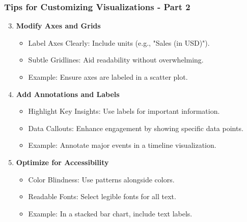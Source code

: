 \documentclass[aspectratio=169]{beamer}
\begin{document}
\begin{frame}[fragile]
    \frametitle{Tips for Customizing Visualizations - Part 2}
    \begin{enumerate}
        \setcounter{enumi}{2} %
        \item \textbf{Modify Axes and Grids}
            \begin{itemize}
                \item Label Axes Clearly: Include units (e.g., "Sales (in USD)").
                \item Subtle Gridlines: Aid readability without overwhelming.
                \item Example: Ensure axes are labeled in a scatter plot.
            \end{itemize}

        \item \textbf{Add Annotations and Labels}
            \begin{itemize}
                \item Highlight Key Insights: Use labels for important information.
                \item Data Callouts: Enhance engagement by showing specific data points.
                \item Example: Annotate major events in a timeline visualization.
            \end{itemize}

        \item \textbf{Optimize for Accessibility}
            \begin{itemize}
                \item Color Blindness: Use patterns alongside colors.
                \item Readable Fonts: Select legible fonts for all text.
                \item Example: In a stacked bar chart, include text labels.
            \end{itemize}
    \end{enumerate}
\end{frame}
\end{document}
